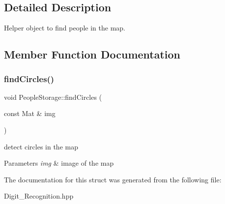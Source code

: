 \subsection{Detailed Description}
Helper object to find people in the map. 

\subsection{Member Function Documentation}
\mbox{\label{struct_people_storage_a97206f5a49064a68924059861deab436}} 
\subsubsection{\texorpdfstring{find\+Circles()}{findCircles()}}
{\footnotesize\ttfamily void People\+Storage\+::find\+Circles (\begin{DoxyParamCaption}\item[{const Mat \&}]{img }\end{DoxyParamCaption})\hspace{0.3cm}{\ttfamily [inline]}}

detect circles in the map 
\begin{DoxyParams}{Parameters}
{\em img} & image of the map \\
\hline
\end{DoxyParams}


The documentation for this struct was generated from the following file\+:\begin{DoxyCompactItemize}
\item 
Digit\+\_\+\+Recognition.\+hpp\end{DoxyCompactItemize}
